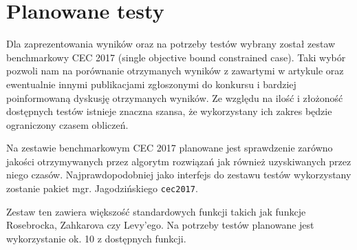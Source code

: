 \section{Planowane testy}

Dla zaprezentowania wyników oraz na potrzeby testów wybrany został zestaw benchmarkowy CEC 2017 (single objective bound constrained case). Taki wybór pozwoli nam na porównanie otrzymanych wyników z zawartymi w artykule oraz ewentualnie innymi publikacjami zgłoszonymi do konkursu i bardziej poinformowaną dyskusję otrzymanych wyników. Ze względu na ilość i złożoność dostępnych testów istnieje znaczna szansa, że wykorzystany ich zakres będzie ograniczony czasem obliczeń.

Na zestawie benchmarkowym CEC 2017 planowane jest sprawdzenie zarówno jakości otrzymywanych przez algorytm rozwiązań jak również uzyskiwanych przez niego czasów. Najprawdopodobniej jako interfejs do zestawu testów wykorzystany zostanie pakiet mgr. Jagodzińskiego \verb+cec2017+.

Zestaw ten zawiera większość standardowych funkcji takich jak funkcje Rosebrocka, Zahkarova czy Levy'ego. Na potrzeby testów planowane jest wykorzystanie ok. 10 z dostępnych funkcji.

